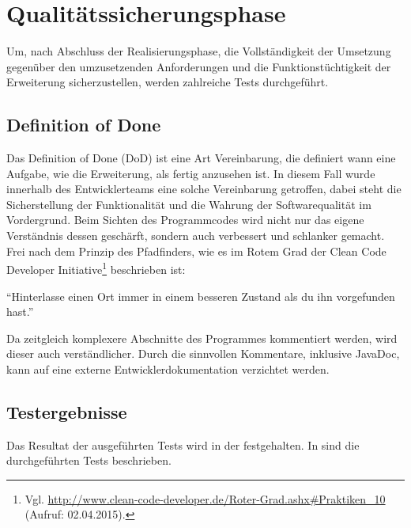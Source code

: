\section{Qualitätssicherungsphase}
\label{sec:Qualitätssicherungsphase}
Um, nach Abschluss der Realisierungsphase, die Vollständigkeit der Umsetzung gegenüber den umzusetzenden Anforderungen und die
Funktionstüchtigkeit der Erweiterung sicherzustellen, werden zahlreiche Tests durchgeführt.


\subsection{Definition of Done}
\label{sub:Definition of Done}
Das Definition of Done (DoD) ist eine Art Vereinbarung, die definiert wann eine Aufgabe, wie die Erweiterung, als fertig anzusehen
ist. In diesem Fall wurde innerhalb des Entwicklerteams eine solche Vereinbarung getroffen, dabei steht die Sicherstellung der
Funktionalität und die Wahrung der Softwarequalität im Vordergrund. Beim Sichten des Programmcodes wird nicht nur das eigene
Verständnis dessen geschärft, sondern auch verbessert und schlanker gemacht. Frei nach dem Prinzip des Pfadfinders, wie es im
Rotem Grad der Clean Code Developer Initiative\footnote{Vgl.
\url{http://www.clean-code-developer.de/Roter-Grad.ashx\#Praktiken_10} (Aufruf: 02.04.2015).} beschrieben ist:

"`Hinterlasse einen Ort immer in einem besseren Zustand als du ihn vorgefunden hast."'

Da zeitgleich komplexere Abschnitte des Programmes kommentiert werden, wird dieser auch verständlicher. Durch die sinnvollen
Kommentare, inklusive JavaDoc, kann auf eine externe Entwicklerdokumentation verzichtet werden.

\begingroup
\setlength\intextsep{0pt}


\subsection{Testergebnisse}
\label{sub:Testergebnisse}
Das Resultat der ausgeführten Tests wird in der  festgehalten.  In  sind die
durchgeführten Tests beschrieben.
